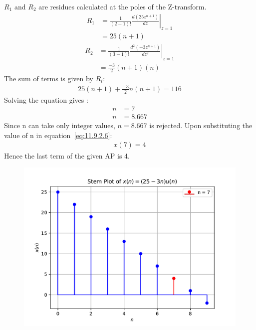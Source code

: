\documentclass[journal,12pt,twocolumn]{IEEEtran}
\theoremstyle{remark}
\begin{document}
 $R_1$ and $R_2$ are residues calculated at the poles of the Z-transform.
\begin{align}
		R_1 &= \frac{1}{{(2-1)!}} \left. \frac{d (25z^{n+1})}{dz} \right|_{z=1} \\
	&=25(n+1)
\end{align}
\begin{align}
	R_2 &= \frac{1}{{(3-1)!}} \left. \frac{d^2(-3z^{n+1})}{dz^2} \right|_{z=1} \\
	&= \frac{-3}{2}(n+1)(n)
\end{align}
The sum of terms is given by $R_i$:
 \begin{align}
25(n+1)	+ \frac{-3}{2} n(n+1) = 116 
 \end{align}
Solving the equation gives :
\begin{align}
	n&=7\\ n&=8.667
\end{align}
Since n can take only integer values, $n=8.667$ is rejected. 
Upon substituting the value of n in equation~\eqref{eq:11.9.2.6}:
\begin{align}
	x(7)=4
\end{align}
Hence the last term of the given AP is 4.
\begin{figure}[h!]
    \centering
    \includegraphics[width=\columnwidth]{figs/stem_plot.pdf}
\end{figure}
\end{document}
